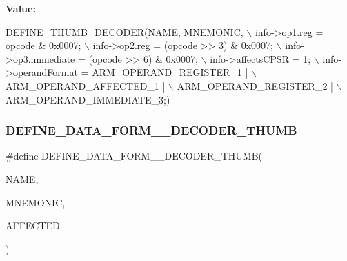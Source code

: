 {\bfseries Value\+:}
\begin{DoxyCode}
\mbox{\hyperlink{decoder-thumb_8c_a44d34ec3fd7c2c2ee51ff5966678c86e}{DEFINE\_THUMB\_DECODER}}(\mbox{\hyperlink{inflate_8h_a164ea0159d5f0b5f12a646f25f99eceaa67bc2ced260a8e43805d2480a785d312}{NAME}}, MNEMONIC, \(\backslash\)
        \mbox{\hyperlink{libretro_8h_structretro__game__info}{info}}->op1.reg = opcode & 0x0007; \(\backslash\)
        \mbox{\hyperlink{libretro_8h_structretro__game__info}{info}}->op2.reg = (opcode >> 3) & 0x0007; \(\backslash\)
        \mbox{\hyperlink{libretro_8h_structretro__game__info}{info}}->op3.immediate = (opcode >> 6) & 0x0007; \(\backslash\)
        \mbox{\hyperlink{libretro_8h_structretro__game__info}{info}}->affectsCPSR = 1; \(\backslash\)
        \mbox{\hyperlink{libretro_8h_structretro__game__info}{info}}->operandFormat = ARM\_OPERAND\_REGISTER\_1 | \(\backslash\)
            ARM\_OPERAND\_AFFECTED\_1 | \(\backslash\)
            ARM\_OPERAND\_REGISTER\_2 | \(\backslash\)
            ARM\_OPERAND\_IMMEDIATE\_3;)
\end{DoxyCode}
\mbox{\label{decoder-thumb_8c_a2d840a1d57010bf5110f5c095fe9a6a8}} 
\subsubsection{\texorpdfstring{D\+E\+F\+I\+N\+E\+\_\+\+D\+A\+T\+A\+\_\+\+F\+O\+R\+M\+\_\+\_\+\+D\+E\+C\+O\+D\+E\+R\+\_\+\+T\+H\+U\+MB}{DEFINE\_DATA\_FORM\_3\_DECODER\_THUMB}}
{\footnotesize\ttfamily \#define D\+E\+F\+I\+N\+E\+\_\+\+D\+A\+T\+A\+\_\+\+F\+O\+R\+M\+\_\+\_\+\+D\+E\+C\+O\+D\+E\+R\+\_\+\+T\+H\+U\+MB(\begin{DoxyParamCaption}\item[{}]{\mbox{\hyperlink{inflate_8h_a164ea0159d5f0b5f12a646f25f99eceaa67bc2ced260a8e43805d2480a785d312}{N\+A\+ME}},  }\item[{}]{M\+N\+E\+M\+O\+N\+IC,  }\item[{}]{A\+F\+F\+E\+C\+T\+ED }\end{DoxyParamCaption})}

